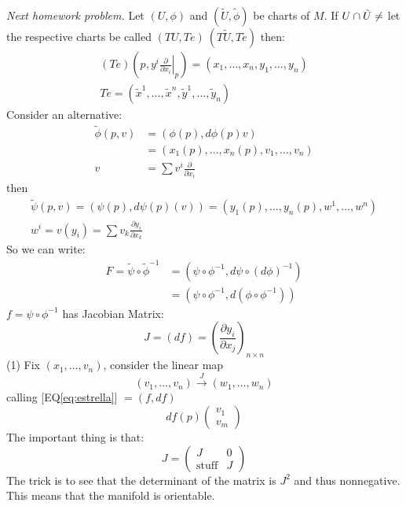 \emph{Next homework problem.} Let $(U,\phi)$ and $(\tilde U, \tilde \phi)$ be charts of $M$. If $U\cap\tilde U \neq \empty$ let the respective charts be called $(TU,Te)\ (T\tilde U,T\tilde e)$ then:
\begin{gather*}
(Te)\left(p,y^i \left.\frac{\partial}{\partial x_i} \right|_p\right)=(x_1,\ldots,x_n,y_1,\ldots, y_n)\\
T\tilde e = (\tilde x^1,\ldots,\tilde x^n,\tilde y^1,\ldots, \tilde y_n)
\end{gather*}
Consider an alternative:
\begin{align*}
\tilde \phi(p,v) & = (\phi(p),d\phi(p)v) \\
               &= (x_1(p),\ldots, x_n(p),v_1,\ldots, v_n)\\
              v&= \sum v^i \frac{\partial}{\partial x_i} 
\end{align*}
then 
\begin{gather*}
\tilde \psi(p,v) = (\psi(p), d\psi(p)(v)) = (y_1(p),\ldots,y_n(p),w^1,\ldots, w^n)\\
w^i=v(y_i)=\sum v_k \frac{\partial y_i}{\partial x_k} 
\end{gather*}
So we can write:
\begin{align}
F=\tilde \psi\circ \tilde \phi ^{-1} &= (\psi\circ \phi ^{-1} , d\psi\circ(d\phi) ^{-1} )\\
                                     &= (\psi\circ \phi ^{-1} , d(\phi\circ\phi ^{-1} )) \label{eq:estrella}
\end{align}
$f=\psi\circ \phi ^{-1} $ has Jacobian Matrix:
$$J=(df) = \left(\frac{\partial y_i }{\partial x_j} \right)_{n\times n} $$
(1) Fix $(x_1,\ldots, v_n)$, consider the linear map
$$(v_1,\ldots, v_n) \xrightarrow{J} (w_1,\ldots, w_n)$$
calling [EQ\ref{eq:estrella}] $=(f,df)$ $$df(p)\begin{pmatrix} v_1 \\ v_m \end{pmatrix}$$
The important thing is that:
$$J=\left(\begin{array}{c|c} J & 0 \\ \hline  \text{stuff} & J \end{array}\right)$$
The trick is to see that the determinant of the matrix is $J^2$ and thus nonnegative. This means that the manifold is orientable.
